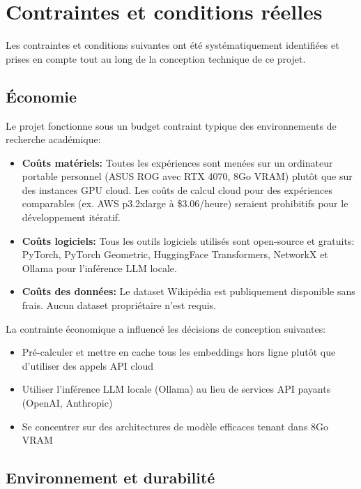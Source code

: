\section{Contraintes et conditions réelles}

Les contraintes et conditions suivantes ont été systématiquement identifiées et prises en compte tout au long de la conception technique de ce projet.

\subsection{Économie}

Le projet fonctionne sous un budget contraint typique des environnements de recherche académique:

\begin{itemize}
    \item \textbf{Coûts matériels:} Toutes les expériences sont menées sur un ordinateur portable personnel (ASUS ROG avec RTX 4070, 8Go VRAM) plutôt que sur des instances GPU cloud. Les coûts de calcul cloud pour des expériences comparables (ex. AWS p3.2xlarge à \$3.06/heure) seraient prohibitifs pour le développement itératif.
    \item \textbf{Coûts logiciels:} Tous les outils logiciels utilisés sont open-source et gratuits: PyTorch, PyTorch Geometric, HuggingFace Transformers, NetworkX et Ollama pour l'inférence LLM locale.
    \item \textbf{Coûts des données:} Le dataset Wikipédia est publiquement disponible sans frais. Aucun dataset propriétaire n'est requis.
\end{itemize}

La contrainte économique a influencé les décisions de conception suivantes:
\begin{itemize}
    \item Pré-calculer et mettre en cache tous les embeddings hors ligne plutôt que d'utiliser des appels API cloud
    \item Utiliser l'inférence LLM locale (Ollama) au lieu de services API payants (OpenAI, Anthropic)
    \item Se concentrer sur des architectures de modèle efficaces tenant dans 8Go VRAM
\end{itemize}

\subsection{Environnement et durabilité}

